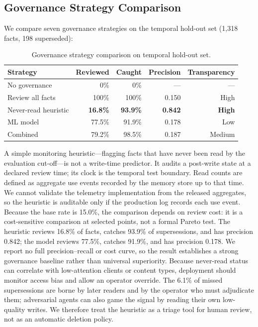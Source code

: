 \documentclass[sigconf,nonacm]{acmart}
\begin{document}
\subsection{Governance Strategy Comparison}
\label{sec:governance}

We compare seven governance strategies on the temporal hold-out set (1,318 facts, 198 superseded):

\begin{table}[h]
\centering
\caption{Governance strategy comparison on temporal hold-out set.}
\label{tab:governance}
\begin{tabular}{lrrrr}
\toprule
Strategy & Reviewed & Caught & Precision & Transparency \\
\midrule
No governance & 0\% & 0\% & --- & --- \\
Review all facts & 100\% & 100\% & 0.150 & High \\
Never-read heuristic & \textbf{16.8\%} & \textbf{93.9\%} & \textbf{0.842} & \textbf{High} \\
ML model & 77.5\% & 91.9\% & 0.178 & Low \\
Combined & 79.2\% & 98.5\% & 0.187 & Medium \\
\bottomrule
\end{tabular}
\end{table}

A simple monitoring heuristic---flagging facts that have never been read by the evaluation cut-off---is not a write-time predictor. It audits a post-write state at a declared review time; its clock is the temporal test boundary. Read counts are defined as aggregate use events recorded by the memory store up to that time. We cannot validate the telemetry implementation from the released aggregates, so the heuristic is auditable only if the production log records each use event. Because the base rate is 15.0\%, the comparison depends on review cost: it is a cost-sensitive comparison at selected points, not a formal Pareto test. The heuristic reviews 16.8\% of facts, catches 93.9\% of supersessions, and has precision 0.842; the model reviews 77.5\%, catches 91.9\%, and has precision 0.178. We report no full precision--recall or cost curve, so the result establishes a strong governance baseline rather than universal superiority. Because never-read status can correlate with low-attention clients or content types, deployment should monitor access bias and allow an operator override. The 6.1\% of missed supersessions are borne by later readers and by the operator who must adjudicate them; adversarial agents can also game the signal by reading their own low-quality writes. We therefore treat the heuristic as a triage tool for human review, not as an automatic deletion policy.
\end{document}
